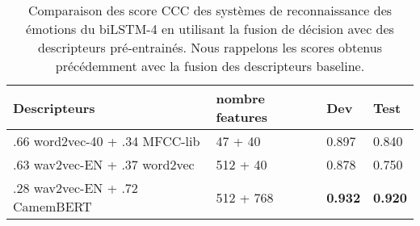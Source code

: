 \begin{table}[h]
  \centering
  \begin{tabular}{|l|l|l|l|}
  \hline
  Descripteurs &nombre features   &Dev   &Test  \\
  \hline
  .66 word2vec-40 + .34 MFCC-lib     &47 + 40 &0.897  &0.840  \\
  .63 wav2vec-EN + .37 word2vec      &512 + 40 &0.878 &0.750 \\
  .28 wav2vec-EN + .72 CamemBERT        &512 + 768 &\textbf{0.932} &\textbf{0.920} \\
  \hline
\end{tabular}
\caption{Comparaison des score CCC des systèmes de reconnaissance des émotions du biLSTM-4 en utilisant la fusion de décision avec des descripteurs pré-entrainés. Nous rappelons les scores obtenus précédemment avec la fusion des descripteurs baseline.}
\label{tab:res_fusion_pretrain}
\end{table}
